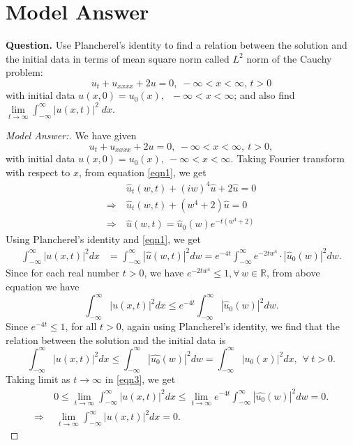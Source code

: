 \documentclass[12pt,leqno]{amsart}
\newcommand{\bb}[1]{\mathbb{#1}}
\numberwithin{equation}{section}
\theoremstyle{definition}
\begin{document}
\date{\today}

\baselineskip=16pt
\section{Model Answer}
\noindent
{\bf Question.} 
Use Plancherel's identity to find a relation between the solution and the initial data 
in terms of mean square norm called \(L^2\) norm of the Cauchy problem: 
$$u_t+u_{xxxx} +2u=0,\;-\infty < x < \infty,\, t>0$$ 
with initial data \(u(x,0)=u_0(x),\;\; -\infty < x < \infty\); and also find 
$\lim\limits_{t\to\infty} \int_{-\infty}^{\infty} |u(x,t)|^2\;dx$.

\begin{proof}[Model Answer:]
We have given 
\begin{equation}\label{eqn1}
u_t + u_{xxxx} + 2u = 0,\ -\infty < x < \infty,\ t > 0, 
\end{equation}
with initial data $u(x, 0) = u_0(x),\ -\infty < x < \infty$. 
Taking Fourier transform with respect to $x$, from equation \eqref{eqn1}, we get 
\begin{align}
&\ \widehat{u}_t(w, t) + (iw)^4\widehat{u} + 2\widehat{u} = 0 \nonumber \\
\Longrightarrow &\ \widehat{u}_t(w, t) + (w^4+2)\widehat{u} = 0 \nonumber \\ 
\Longrightarrow &\ \widehat{u}(w, t) = \widehat{u}_0(w) e^{-t(w^4+2)} \label{eqn2}
\end{align}
Using Plancherel's identity and \eqref{eqn1}, we get 
\begin{align*}
\int_{-\infty}^\infty |u(x, t)|^2 dx & = \int_{-\infty}^\infty |\widehat{u}(w, t)|^2 dw 
= e^{-4t} \int_{-\infty}^\infty e^{-2tw^4}\cdot |\widehat{u}_0(w)|^2dw. %
\end{align*}
Since for each real number $t > 0$, we have $e^{-2tw^4} \leq 1, \forall\, w \in \bb R$, from above equation we have 
\begin{equation}\label{eqn3}
	\int_{-\infty}^\infty |u(x, t)|^2 dx \leq e^{-4t} \int_{-\infty}^\infty |\widehat{u}_0(w)|^2 dw. 
\end{equation}
Since $e^{-4t} \leq 1$, for all $t > 0$, again using Plancherel's identity, 
we find that the relation between the solution and the initial data is 
$$\int_{-\infty}^{\infty} |u(x,t)|^2 dx 
\leq \int_{-\infty}^{\infty} |\widehat{u_0}(w)|^2 dw 
= \int_{-\infty}^\infty |u_0(x)|^2 dx,\ \ \forall\ t > 0.$$ 
Taking limit as $t \to \infty$ in \eqref{eqn3}, we get 
\begin{align}
	& \ 0 \leq \lim\limits_{t\to\infty} \int_{-\infty}^{\infty} |u(x, t)|^2 dx 
	\leq \lim\limits_{t\to\infty} e^{-4t}\int_{-\infty}^{\infty} |\widehat{u_0}(w)|^2 dw = 0. \nonumber \\ 
	\Longrightarrow & \ \ \lim\limits_{t\to\infty} \int_{-\infty}^{\infty} |u(x, t)|^2 dx  = 0. \nonumber
\end{align}
\end{proof}


\date{\today}
\end{document}

